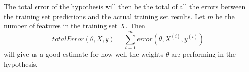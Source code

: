 \documentclass{book}[a5paper]
\begin{document}

The total error of the hypothesis will then be the total of all the errors between the training set predictions and the actual training set results. Let $m$ be the number of features in the training set $X$. Then
\begin{equation}
totalError(\theta, X, y) = \sum_{i=1}^m error(\theta, X^{(i)}, y^{(i)})
\end{equation}
will give us a good estimate for how well the weights $\theta$ are performing in the hypothesis.
\end{document}
